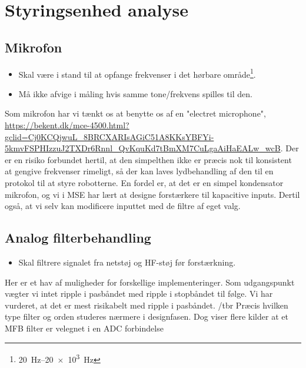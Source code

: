 \section {Styringsenhed analyse}
\subsection{Mikrofon}
\begin{itemize}
    \item Skal være i stand til at opfange frekvenser i det hørbare område\footnote{\SIrange{20}{20e3}{Hz}}. 
    \item Må ikke afvige i måling hvis samme tone/frekvens spilles til den. 
\end{itemize}

Som mikrofon har vi tænkt os at benytte os af en "electret microphone", \url{https://bekent.dk/mce-4500.html?gclid=Cj0KCQjwuL_8BRCXARIsAGiC51A8KKsYBFYi-5kmvFSPHIzzuJ2TXDr6Rnnl_QvKquKd7tBmXM7CuLgaAiHaEALw_wcB}.
Der er en risiko forbundet hertil, at den simpelthen ikke er præcis nok til konsistent at gengive frekvenser rimeligt, så der kan laves lydbehandling af den til en protokol til at styre robotterne. 
En fordel er, at det er en simpel kondensator mikrofon, og vi i MSE har lært at designe forstærkere til kapacitive inputs.
Dertil også, at vi selv kan modificere inputtet med de filtre af eget valg.

\subsection{Analog filterbehandling}
\begin{itemize}
    \item Skal filtrere signalet fra netstøj og HF-støj før forstærkning. 
\end{itemize}

Her er et hav af muligheder for forskellige implementeringer. Som udgangspunkt vægter vi intet ripple i pasbåndet med ripple i stopbåndet til følge. Vi har vurderet, at det er mest risikabelt med ripple i pasbåndet. /tbr %
Præcis hvilken type filter og orden studeres nærmere i designfasen. Dog viser flere kilder at et MFB filter er velegnet i en ADC forbindelse \tbr

